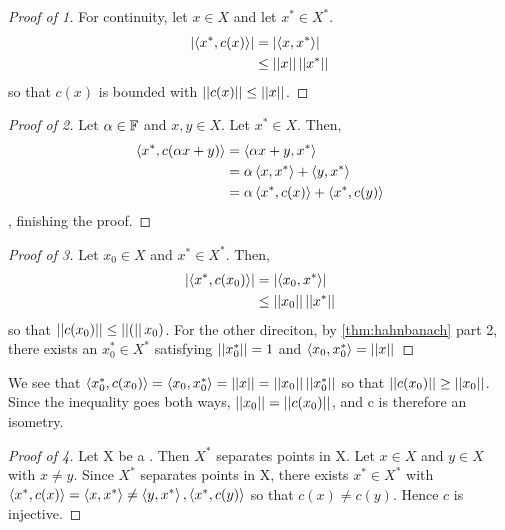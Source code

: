 \begin{prop}
\begin{proof}[Proof of 1]
		For continuity, let $x \in X$
		and let $x^* \in X^*$. 
		\begin{align*}
		\left| \left\langle x^*, c(x) \right\rangle \right| &= \left| \left\langle x, x^* \right\rangle \right|\\
		& \leq \left|\left| x \right|\right|\left|\left| x^* \right|\right|
		\end{align*}
		so that $c(x)$ is bounded with 
		$\left|\left| c(x) \right|\right| \leq \left|\left| x \right|\right|$. 
    \end{proof}
    \begin{proof}[Proof of 2]
        Let $\alpha \in \mathbb{F}$ and $x,y \in X$.
        Let $x^* \in X$. 
		Then, 
		\begin{align*}
		\left\langle x^*, c(\alpha x + y) \right\rangle & = \left\langle \alpha x + y , x^* \right\rangle\\
		& = \alpha \left\langle x,x^* \right\rangle + \left\langle y,x^* \right\rangle \\
		& = \alpha \left\langle x^*, c(x) \right\rangle + \left\langle x^*, c(y) \right\rangle 
		\end{align*}
		, finishing the proof. 
    \end{proof}
    \begin{proof}[Proof of 3]
	Let $x_0 \in X$ and $x^* \in X^*$. 
	Then, 
		\begin{align*}
		\left| \left\langle x^*, c(x_0) \right\rangle \right| &= \left| \left\langle x_0, x^* \right\rangle \right|\\
		& \leq \left|\left| x_0 \right|\right|\left|\left| x^* \right|\right|
		\end{align*}
	so that $\left|\left| c(x_0) \right|\right| \leq \left|\left| ( \right|\right|x_0)$. 
	For the other direciton, by
	\ref{thm:hahnbanach}
	part 2, there exists an 
	$x_0^* \in X^*$ satisfying
	$\left|\left| x_0^* \right|\right| = 1$ 
	and $\left\langle x_0, x_0^* \right\rangle = \left|\left| x \right|\right|$
    \end{proof}
	We see that 
	$ \left\langle x_0^*, c(x_0)  \right\rangle = \left\langle x_0, x_0^* \right\rangle = \left|\left| x \right|\right| = \left|\left| x_0 \right|\right| \left|\left| x_0^* \right|\right|$
	so that $\left|\left| c(x_0) \right|\right| \geq \left|\left| x_0 \right|\right|$. 
	Since the inequality goes both ways, 
	$\left|\left| x_0 \right|\right| = \left|\left| c(x_0) \right|\right|$, and 
	c is therefore an isometry. 
    \begin{proof}[Proof of 4]
	Let X be a \NormedSpace. 
	Then $X^*$ separates points in X. 
	Let $x \in X$ 
	and $y \in X$ 
	with $x \neq y$. 
	Since $X^*$ separates points in X, 
	there exists $x^* \in X^*$ with 
	$\left\langle x^*, c(x)  \right\rangle =\left\langle x,x^* \right\rangle \neq \left\langle y,x^* \right\rangle, \left\langle x^*, c(y) \right\rangle$
	so that $c(x) \neq c(y)$.
	Hence $c$ is injective. 
	

\end{proof}
\end{prop}
